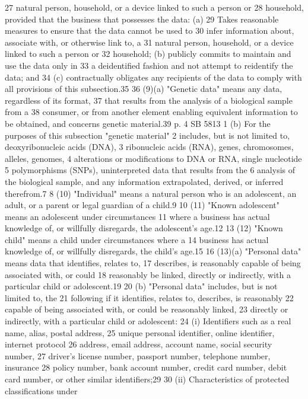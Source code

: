 27 natural person, household, or a device linked to such a person or
28 household, provided that the business that possesses the data: (a)
29 Takes reasonable measures to ensure that the data cannot be used to
30 infer information about, associate with, or otherwise link to, a
31 natural person, household, or a device linked to such a person or
32 household; (b) publicly commits to maintain and use the data only in
33 a deidentified fashion and not attempt to reidentify the data; and
34 (c) contractually obligates any recipients of the data to comply with
all provisions of this subsection.35
36 (9)(a) "Genetic data" means any data, regardless of its format,
37 that results from the analysis of a biological sample from a
38 consumer, or from another element enabling equivalent information to
be obtained, and concerns genetic material.39
p. 4 SB 5813
1 (b) For the purposes of this subsection "genetic material"
2 includes, but is not limited to, deoxyribonucleic acids (DNA),
3 ribonucleic acids (RNA), genes, chromosomes, alleles, genomes,
4 alterations or modifications to DNA or RNA, single nucleotide
5 polymorphisms (SNPs), uninterpreted data that results from the
6 analysis of the biological sample, and any information extrapolated,
derived, or inferred therefrom.7
8 (10) "Individual" means a natural person who is an adolescent, an
adult, or a parent or legal guardian of a child.9
10 (11) "Known adolescent" means an adolescent under circumstances
11 where a business has actual knowledge of, or willfully disregards,
the adolescent's age.12
13 (12) "Known child" means a child under circumstances where a
14 business has actual knowledge of, or willfully disregards, the
child's age.15
16 (13)(a) "Personal data" means data that identifies, relates to,
17 describes, is reasonably capable of being associated with, or could
18 reasonably be linked, directly or indirectly, with a particular child
or adolescent.19
20 (b) "Personal data" includes, but is not limited to, the
21 following if it identifies, relates to, describes, is reasonably
22 capable of being associated with, or could be reasonably linked,
23 directly or indirectly, with a particular child or adolescent:
24 (i) Identifiers such as a real name, alias, postal address,
25 unique personal identifier, online identifier, internet protocol
26 address, email address, account name, social security number,
27 driver's license number, passport number, telephone number, insurance
28 policy number, bank account number, credit card number, debit card
number, or other similar identifiers;29
30 (ii) Characteristics of protected classifications under
